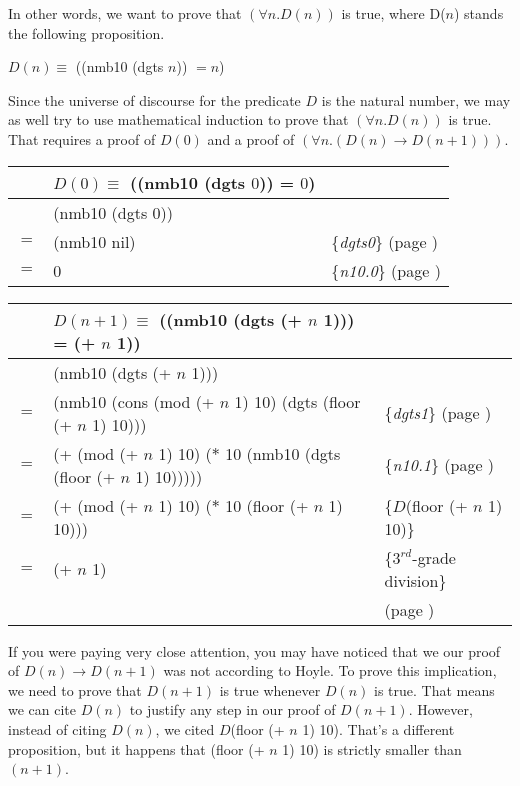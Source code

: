 In other words, we want to prove that
$(\forall n.D(n))$ is true, where D($n$) stands the following proposition.
\begin{center}
$D(n) \equiv$ ((nmb10 (dgts $n$)) $= n$)
\end{center}

Since the universe of discourse
for the predicate $D$ is the natural number,
we may as well try to use mathematical induction
to prove that $(\forall n.D(n))$ is true.
That requires a proof of $D(0)$ and
a proof of $(\forall n.(D(n) \rightarrow D(n+1)))$.

\begin{center}
\begin{tabular}{lll}
    & $D(0) \equiv$ ((nmb10 (dgts $0$)) = $0$) & \\
    \hline
    & (nmb10 (dgts $0$)) & \\
$=$ & (nmb10 nil)        & \{\emph{dgts0}\} (page \pageref{dgts-defun}) \\
$=$ & 0                  & \{\emph{n10.0}\} (page \pageref{nmb10-defun}) \\
\end{tabular}
\end{center}

\begin{center}
\begin{tabular}{lll}
    & $D(n+1) \equiv$ ((nmb10 (dgts (+ $n$ 1))) = (+ $n$ 1)) & \\
    \hline
    & (nmb10 (dgts (+ $n$ 1)))           & \\
$=$ & (nmb10 (cons (mod (+ $n$ 1) 10) (dgts (floor (+ $n$ 1) 10)))  & \{\emph{dgts1}\} (page \pageref{dgts-defun})\\
$=$ & (+ (mod (+ $n$ 1) 10) ($*$ 10 (nmb10 (dgts (floor (+ $n$ 1) 10)))))  & \{\emph{n10.1}\} (page \pageref{nmb10-defun})\\
$=$ & (+ (mod (+ $n$ 1) 10) ($*$ 10 (floor (+ $n$ 1) 10)))  & \{$D$(floor (+ $n$ 1) 10)\} \\
$=$ & (+ $n$ 1)  & \{$3^{rd}$-grade division\}\\
    &            & (page \pageref{third-grade-division})
\end{tabular}
\end{center}

If you were paying very close attention,
you may have noticed that we our proof of $D(n) \rightarrow D(n+1)$
was not according to Hoyle.
To prove this implication, we need to prove that $D(n+1)$ is true whenever $D(n)$ is true.
That means we can cite $D(n)$ to justify any step in our proof of $D(n+1)$.
However, instead of citing $D(n)$, we cited $D$(floor (+ $n$ 1) 10).
That's a different proposition,
but it happens that (floor (+ $n$ 1) 10) is strictly smaller than $(n+1)$.


